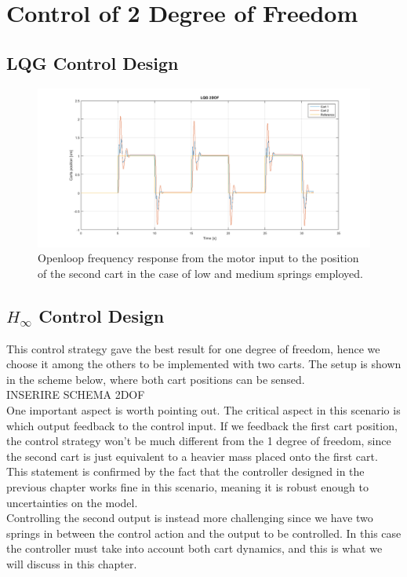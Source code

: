 \chapter{Control of 2 Degree of Freedom}

\section{LQG Control Design}

\begin{figure}[h]
\centering
\includegraphics[width=0.5\linewidth]{img/lqg_2dof.png}
\caption{Openloop frequency response from the motor input to the position of the second cart in the case of low and medium springs employed.}
\label{fig:lqg2dof}
\end{figure}
\section{$H_\infty$ Control Design}
This control strategy gave the best result for one degree of freedom, hence we choose it among the others to be implemented with two carts. The setup is shown in the scheme below, where both cart positions can be sensed.\\

INSERIRE SCHEMA 2DOF\\

One important aspect is worth pointing out. The critical aspect in this scenario is which output feedback to the control input. If we feedback the first cart position, the control strategy won't be much different from the 1 degree of freedom, since the second cart is just equivalent to a heavier mass placed onto the first cart. This statement is confirmed by the fact that the controller designed in the previous chapter works fine in this scenario, meaning it is robust enough to uncertainties on the model.\\

Controlling the second output is instead more challenging since we have two springs in between the control action and the output to be controlled. In this case the controller must take into account both cart dynamics, and this is what we will discuss in this chapter.\\


